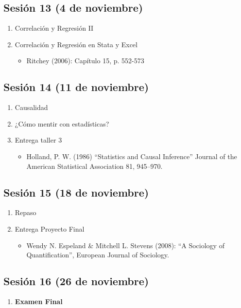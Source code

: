 \documentclass[letterpaper]{article}
\begin{document}
\subsection{Sesión 13 (4 de noviembre)}
\begin{enumerate}
\item Correlación y Regresión II
\item Correlación y Regresión en Stata y Excel	
\begin{itemize}
\item Ritchey (2006): Capítulo 15, p.
552-573
\end{itemize}
\end{enumerate}

\subsection{Sesión 14 (11 de noviembre)}
\begin{enumerate}
\item Causalidad
\item ¿Cómo mentir con estadísticas?
\item Entrega taller 3
\begin{itemize}
\item Holland, P. W. (1986) “Statistics and Causal Inference” Journal of
the American Statistical Association 81, 945–970.
\end{itemize}
\end{enumerate}

\subsection{Sesión 15 (18 de noviembre)}
\begin{enumerate}
\item Repaso
\item Entrega Proyecto Final
\begin{itemize}
\item Wendy N. Espeland \& Mitchell L. Stevens (2008): “A Sociology of Quantification”,
European Journal of Sociology.
\end{itemize}
\end{enumerate}

\subsection{Sesión 16 (26 de noviembre)}
\begin{enumerate}
\item {\bf Examen Final}
\end{enumerate}
\end{document}
